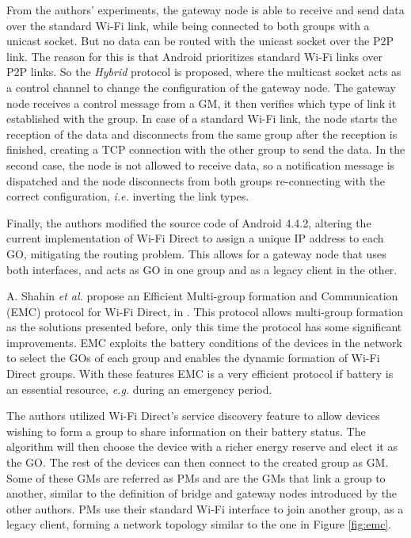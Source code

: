 From the authors' experiments, the gateway node is able to receive and send data over the standard Wi-Fi link, while being connected to both groups with a unicast socket. But no data can be routed with the unicast socket over the P2P link. The reason for this is that Android  prioritizes standard Wi-Fi links over P2P links. So the \textit{Hybrid} protocol is proposed, where the multicast socket acts as a control channel to change the configuration of the gateway node. The gateway node receives a control message from a \gls{GM}, it then verifies which type of link it established with the group. In case of a standard Wi-Fi link, the node starts the reception of the data and disconnects from the same group after the reception is finished, creating a \gls{TCP} connection with the other group to send the data. In the second case, the node is not allowed to receive data, so a notification message is dispatched and the node disconnects from both groups re-connecting with the correct configuration, \textit{i.e.} inverting the link types.

Finally, the authors modified the source code of Android 4.4.2, altering the current implementation of Wi-Fi Direct to assign a unique \gls{IP} address to each \gls{GO}, mitigating the routing problem. This allows for a gateway node that uses both interfaces, and acts as \gls{GO} in one group and as a legacy client in the other.\newline

A. Shahin \textit{et al.} propose an Efficient Multi-group formation and Communication (EMC) protocol for Wi-Fi Direct, in \cite{emc}. This protocol allows multi-group formation as the solutions presented before, only this time the protocol has some significant improvements. EMC exploits the battery conditions of the devices in the network to select the \glspl{GO} of each group and enables the dynamic formation of Wi-Fi Direct groups. With these features EMC is a very efficient protocol if battery is an essential resource, \textit{e.g.} during an emergency period.

The authors utilized Wi-Fi Direct's service discovery feature to allow devices wishing to form a group to share information on their battery status. The algorithm will then choose the device with a richer energy reserve and elect it as the \gls{GO}. The rest of the devices can then connect to the created group as \gls{GM}. Some of these \glspl{GM} are referred as \glspl{PM} and are the \glspl{GM} that link a group to another, similar to the definition of bridge and gateway nodes introduced by the other authors. \glspl{PM} use their standard Wi-Fi interface to join another group, as a legacy client, forming a network topology similar to the one in Figure \ref{fig:emc}.

